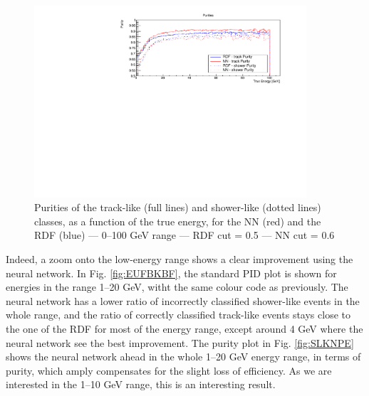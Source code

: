 \begin{figure}[!h]
    \centering
    \includegraphics[width=0.9\textwidth]{fig/PID_Purity_RDF_CUT_0_5_VS_NN_CUT_0_6_E_cut_100.pdf}
    \caption{Purities of the track-like (full lines) and shower-like (dotted lines) classes, as a function of the true energy, for the NN (red) and the RDF (blue)  --- 0--100 GeV range --- RDF cut = 0.5 --- NN cut = 0.6}
    \label{fig:OIDLMRU}
\end{figure}

Indeed, a zoom onto the low-energy range shows a clear improvement using the neural network. In Fig. \ref{fig:EUFBKBF}, the standard PID plot is shown for energies in the range 1--20 GeV, witht the same colour code as previously. The neural network has a lower ratio of incorrectly classified shower-like events in the whole range, and the ratio of correctly classified track-like events stays close to the one of the RDF for most of the energy range, except around 4 GeV where the neural network see the best improvement. The purity plot in Fig. \ref{fig:SLKNPE} shows the neural network ahead in the whole 1--20 GeV energy range, in terms of purity, which amply compensates for the slight loss of efficiency. As we are interested in the 1--10 GeV range, this is an interesting result.

